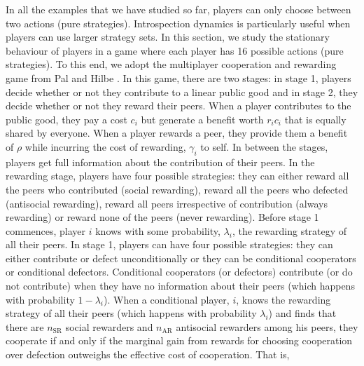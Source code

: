 \documentclass[11pt]{article}
\theoremstyle{plainCl1}
\theoremstyle{plainCl2}
\begin{document}
In all the examples that we have studied so far, players can only choose between two actions (pure strategies). Introspection dynamics is particularly useful when players can use larger strategy sets. In this section, we study the stationary behaviour of players in a game where each player has 16 possible actions (pure strategies). To this end, we adopt the multiplayer cooperation and rewarding game from Pal and Hilbe \cite{Pal:NatCom:2022}. In this game, there are two stages: in stage 1, players decide whether or not they contribute to a linear public good and in stage 2, they decide whether or not they reward their peers. When a player contributes to the public good, they pay a cost $c_i$ but generate a benefit worth $r_i c_i$ that is equally shared by everyone. When a player rewards a peer, they provide them a benefit of $\rho$ while incurring the cost of rewarding, $\gamma_i$ to self. In between the stages, players get full information about the contribution of their peers. In the rewarding stage, players have four possible strategies: they can either reward all the peers who contributed (social rewarding), reward all the peers who defected (antisocial rewarding), reward all peers irrespective of contribution (always rewarding) or reward none of the peers (never rewarding). Before stage 1 commences, player $i$ knows with some probability, $\lambda_i$, the rewarding strategy of all their peers. In stage 1, players can have four possible strategies: they can either contribute or defect unconditionally or they can be conditional cooperators or conditional defectors. Conditional cooperators (or defectors) contribute (or do not contribute) when they have no information about their peers (which happens with probability $1 - \lambda_i$). When a conditional player, $i$, knows the rewarding strategy of all their peers (which happens with probability $\lambda_i$) and finds that there are $n_{\mathrm{SR}}$ social rewarders and $n_{\mathrm{AR}}$ antisocial rewarders among his peers, they cooperate if and only if the marginal gain from rewards for choosing cooperation over defection outweighs the effective cost of cooperation. That is, 
\end{document}
